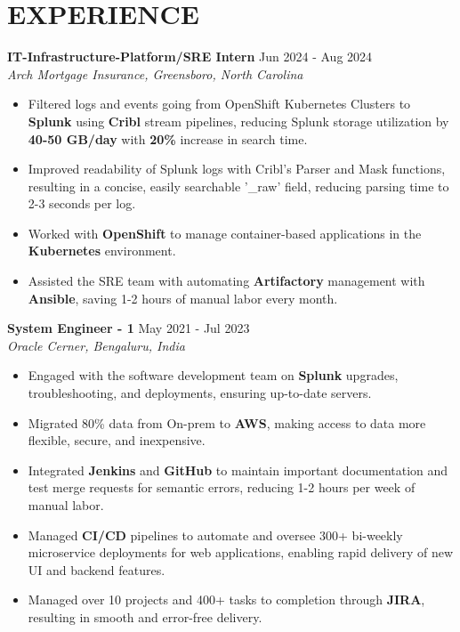 \documentclass[a4paper,9pt]{extarticle}
\begin{document}
\section*{EXPERIENCE}
\noindent
\textbf{IT-Infrastructure-Platform/SRE Intern}
\hfill Jun 2024 - Aug 2024\\ %
\textit{Arch Mortgage Insurance, Greensboro, North Carolina}
\begin{itemize}
    \item Filtered logs and events going from OpenShift Kubernetes Clusters to \textbf{Splunk} using \textbf{Cribl} stream pipelines, reducing Splunk storage utilization by \textbf{40-50 GB/day} with \textbf{20\%} increase in search time.
    \item Improved readability of Splunk logs with Cribl's Parser and Mask functions, resulting in a concise, easily searchable '\_raw' field, reducing parsing time to 2-3 seconds per log.
    \item Worked with \textbf{OpenShift} to manage container-based applications in the \textbf{Kubernetes} environment.
    \item Assisted the SRE team with automating \textbf{Artifactory} management with \textbf{Ansible}, saving 1-2 hours of manual labor every month.
    

\end{itemize}

\noindent
\textbf{System Engineer - 1}
\hfill May 2021 - Jul 2023\\ %
\textit{Oracle Cerner, Bengaluru, India}
\begin{itemize}
    \item Engaged with the software development team on \textbf{Splunk} upgrades, troubleshooting, and deployments, ensuring up-to-date servers.
    \item Migrated 80\% data from On-prem to \textbf{AWS}, making access to data more flexible, secure, and inexpensive.
    \item Integrated \textbf{Jenkins} and \textbf{GitHub} to maintain important documentation and test merge requests for semantic errors, reducing 1-2 hours per week of manual labor.
    \item Managed \textbf{CI/CD} pipelines to automate and oversee 300+ bi-weekly microservice deployments for web applications, enabling rapid delivery of new UI and backend features.
    \item Managed over 10 projects and 400+ tasks to completion through \textbf{JIRA}, resulting in smooth and error-free delivery. 
\end{itemize}
\end{document}

